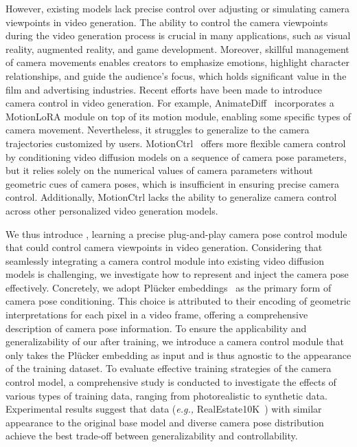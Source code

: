 However, existing models lack precise control over adjusting or simulating camera viewpoints in video generation. 
%
The ability to control the camera viewpoints during the video generation process is crucial in many applications, such as visual reality, augmented reality, and game development. 
%
Moreover, skillful management of camera movements enables creators to emphasize emotions, highlight character relationships, and guide the audience's focus, which holds significant value in the film and advertising industries.
%
Recent efforts have been made to introduce camera control in video generation. For example, AnimateDiff~\citep{animatediff} incorporates a MotionLoRA module on top of its motion module, enabling some specific types of camera movement. 
%
Nevertheless, it struggles to generalize to the camera trajectories customized by users.
%
MotionCtrl~\citep{motionctrl} offers more flexible camera control by conditioning video diffusion models on a sequence of camera pose parameters, but it relies solely on the numerical values of camera parameters without geometric cues of camera poses, which is insufficient in ensuring precise camera control. 
%
Additionally, MotionCtrl lacks the ability to generalize camera control across other personalized video generation models.

We thus introduce \method, learning a precise plug-and-play camera pose control module that could control camera viewpoints in video generation. 
%
Considering that seamlessly integrating a camera control module into existing video diffusion models is challenging, we investigate how to represent and inject the camera pose effectively. 
%
Concretely, we adopt Plücker embeddings~\citep{lfn} as the primary form of camera pose conditioning.
%
This choice is attributed to their encoding of geometric interpretations for each pixel in a video frame, offering a comprehensive description of camera pose information.
%
To ensure the applicability and generalizability of our \method after training, we introduce a camera control module that only takes the Plücker embedding as input and is thus agnostic to the appearance of the training dataset.
%
To evaluate effective training strategies of the camera control model, a comprehensive study is conducted to investigate the effects of various types of training data, ranging from photorealistic to synthetic data.
%
Experimental results suggest that data (\emph{e.g.,} RealEstate10K~\citep{realestate10k}) with similar appearance to the original base model and diverse camera pose distribution achieve the best trade-off between generalizability and controllability.

